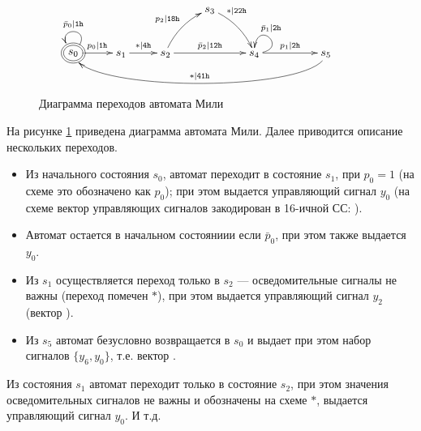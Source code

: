 \begin{figure}[!ht]
    \[
        {\xymatrix{
            *{}
                &*{}
                    &*{}
                        &s_3  \ar@{->}@/^/[dr]^(.3){*|\Machine{22h}} 
                            &*{}
                                &*{}
                                    &*{}
                                        &*{}
                                            \\
            *++[o][F=]{s_0}  \ar@{->}[r]^{p_0|\Machine{1h}}  \ar@{->}@(ur,ul)[]_{\bar{p}_0|\Machine{1h}}
                &s_1  \ar@{->}[r]^{*|\Machine{4h}}
                    &s_2  \ar@{->}[rr]^{\bar{p}_2|\Machine{12h}} \ar@{->}@/^/[ur]^{p_2|\Machine{18h}}
                        &*{}
                            &s_4  \ar@{->}[rr]^{p_1|\Machine{2h}} \ar@{->}@(r,u)[]_(.6){\bar{p}_1|\Machine{2h}}
                                &*{}
                                    &s_5  \ar@{->}@(d,d)[llllll]_{*|\Machine{41h}}
        }}
    \]
    \caption{Диаграмма переходов автомата Мили}
    \label{fig::ch::practice::MiliDiagram}
\end{figure}

На рисунке \ref{fig::ch::practice::MiliDiagram} приведена диаграмма автомата Мили. Далее приводится описание нескольких переходов.
\begin{itemize}
    \item Из начального состояния $s_0$, автомат переходит в состояние $s_1$, при $p_0=1$ (на схеме это обозначено как $p_0$); при этом выдается управляющий сигнал $y_0$ (на схеме вектор управляющих сигналов закодирован в 16-ичной СС: ).
    
    \item Автомат остается в начальном состояниии если $\bar{p}_0$, при этом также выдается $y_0$.

    \item Из $s_1$ осуществляется переход только в $s_2$ --- осведомительные сигналы не важны (переход помечен $*$), при этом выдается управляющий сигнал $y_2$ (вектор ).
    
    \item Из $s_5$ автомат безусловно возвращается в $s_0$ и выдает при этом набор сигналов $\{y_6,y_0\}$, т.е. вектор .
\end{itemize}

Из состояния $s_1$ автомат переходит только в состояние $s_2$, при этом значения осведомительных сигналов не важны и обозначены на схеме $*$, выдается управляющий сигнал $y_0$. И т.д.

